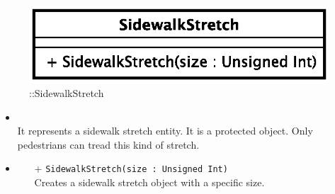 \begin{figure}[h]
\centering
\includegraphics[scale=0.6,keepaspectratio]{images/solution/sidewalk_stretch.eps}
\caption{\pReactiveComponentStretch::SidewalkStretch}
\label{fig:sd-app-sidewalk_stretch}
\end{figure}
\FloatBarrier
\begin{itemize}
  \item \textbf{\descr} \\
    It represents a sidewalk stretch entity. It is a protected object. Only pedestrians
can tread this kind of stretch.
  \item \textbf{\ops}
    \begin{itemize}
      \item[+] \texttt{SidewalkStretch(size : Unsigned Int)} \\
        Creates a sidewalk stretch object with a specific size.
    \end{itemize}
\end{itemize}
